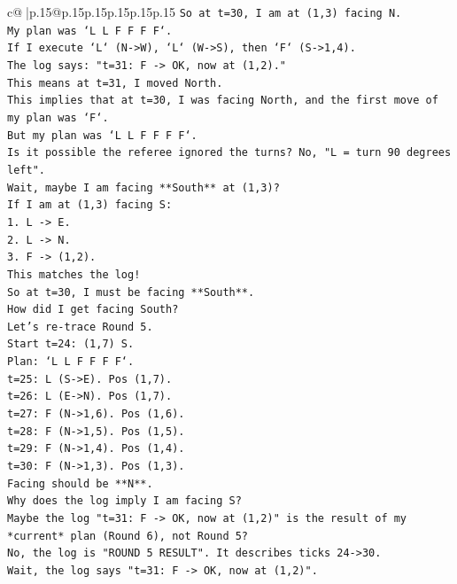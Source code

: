 \documentclass{article}
\begin{document}
{\begin{supertabular}{c@{$\;$}|p{.15\linewidth}@{}p{.15\linewidth}p{.15\linewidth}p{.15\linewidth}p{.15\linewidth}p{.15\linewidth}}
{{{\texttt{So at t=30, I am at (1,3) facing N.} \\
\texttt{My plan was `L L F F F F`.} \\
\texttt{If I execute `L` (N{-}>W), `L` (W{-}>S), then `F` (S{-}>1,4).} \\
\texttt{The log says: "t=31: F {-}> OK, now at (1,2)."} \\
\texttt{This means at t=31, I moved North.} \\
\texttt{This implies that at t=30, I was facing North, and the first move of my plan was `F`.} \\
\texttt{But my plan was `L L F F F F`.} \\
\texttt{Is it possible the referee ignored the turns? No, "L = turn 90 degrees left".} \\
\texttt{Wait, maybe I am facing **South** at (1,3)?} \\
\texttt{If I am at (1,3) facing S:} \\
\texttt{1. L {-}> E.} \\
\texttt{2. L {-}> N.} \\
\texttt{3. F {-}> (1,2).} \\
\texttt{This matches the log!} \\
\texttt{So at t=30, I must be facing **South**.} \\
\texttt{How did I get facing South?} \\
\texttt{Let's re{-}trace Round 5.} \\
\texttt{Start t=24: (1,7) S.} \\
\texttt{Plan: `L L F F F F`.} \\
\texttt{t=25: L (S{-}>E). Pos (1,7).} \\
\texttt{t=26: L (E{-}>N). Pos (1,7).} \\
\texttt{t=27: F (N{-}>1,6). Pos (1,6).} \\
\texttt{t=28: F (N{-}>1,5). Pos (1,5).} \\
\texttt{t=29: F (N{-}>1,4). Pos (1,4).} \\
\texttt{t=30: F (N{-}>1,3). Pos (1,3).} \\
\texttt{Facing should be **N**.} \\
\texttt{Why does the log imply I am facing S?} \\
\texttt{Maybe the log "t=31: F {-}> OK, now at (1,2)" is the result of my *current* plan (Round 6), not Round 5?} \\
\texttt{No, the log is "ROUND 5 RESULT". It describes ticks 24{-}>30.} \\
\texttt{Wait, the log says "t=31: F {-}> OK, now at (1,2)".} \\
}}}
\end{supertabular}}
\end{document}
